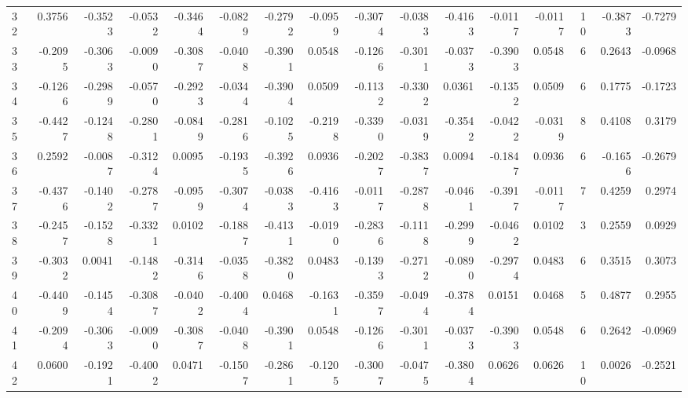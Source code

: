 \begin{tabular}{lrrrrrrrrrrrrrrr}
32  &      0.3756 & -0.3523 & -0.0532 & -0.3464 & -0.0829 & -0.2792 & -0.0959 & -0.3074 & -0.0383 & -0.4163 &  -0.0117 &    -0.0117 &     10 &                   -0.3873 &                    -0.7279 \\
33  &     -0.2095 & -0.3063 & -0.0090 & -0.3087 & -0.0408 & -0.3901 &  0.0548 & -0.1266 & -0.3011 & -0.0373 &  -0.3903 &     0.0548 &      6 &                    0.2643 &                    -0.0968 \\
34  &     -0.1266 & -0.2989 & -0.0570 & -0.2923 & -0.0344 & -0.3904 &  0.0509 & -0.1132 & -0.3302 &  0.0361 &  -0.1352 &     0.0509 &      6 &                    0.1775 &                    -0.1723 \\
35  &     -0.4427 & -0.1248 & -0.2801 & -0.0849 & -0.2816 & -0.1025 & -0.2198 & -0.3390 & -0.0319 & -0.3542 &  -0.0422 &    -0.0319 &      8 &                    0.4108 &                     0.3179 \\
36  &      0.2592 & -0.0087 & -0.3124 &  0.0095 & -0.1935 & -0.3926 &  0.0936 & -0.2027 & -0.3837 &  0.0094 &  -0.1847 &     0.0936 &      6 &                   -0.1656 &                    -0.2679 \\
37  &     -0.4376 & -0.1402 & -0.2787 & -0.0959 & -0.3074 & -0.0383 & -0.4163 & -0.0117 & -0.2878 & -0.0461 &  -0.3917 &    -0.0117 &      7 &                    0.4259 &                     0.2974 \\
38  &     -0.2457 & -0.1528 & -0.3321 &  0.0102 & -0.1887 & -0.4131 & -0.0190 & -0.2836 & -0.1118 & -0.2999 &  -0.0462 &     0.0102 &      3 &                    0.2559 &                     0.0929 \\
39  &     -0.3032 &  0.0041 & -0.1482 & -0.3146 & -0.0358 & -0.3820 &  0.0483 & -0.1393 & -0.2712 & -0.0890 &  -0.2974 &     0.0483 &      6 &                    0.3515 &                     0.3073 \\
40  &     -0.4409 & -0.1454 & -0.3087 & -0.0402 & -0.4004 &  0.0468 & -0.1631 & -0.3597 & -0.0494 & -0.3784 &   0.0151 &     0.0468 &      5 &                    0.4877 &                     0.2955 \\
41  &     -0.2094 & -0.3063 & -0.0090 & -0.3087 & -0.0408 & -0.3901 &  0.0548 & -0.1266 & -0.3011 & -0.0373 &  -0.3903 &     0.0548 &      6 &                    0.2642 &                    -0.0969 \\
42  &      0.0600 & -0.1921 & -0.4002 &  0.0471 & -0.1507 & -0.2861 & -0.1205 & -0.3007 & -0.0475 & -0.3804 &   0.0626 &     0.0626 &     10 &                    0.0026 &                    -0.2521 \\

\end{tabular}
